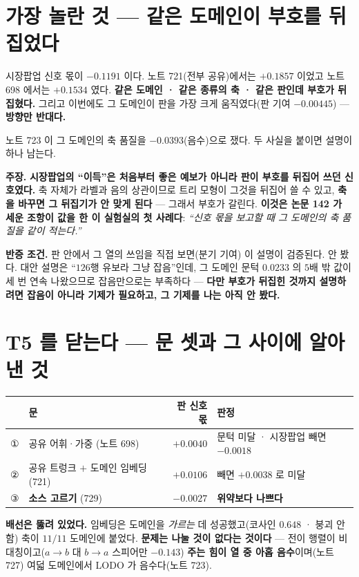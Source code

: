 \documentclass[10pt,a4paper]{article}
\newcommand{\claim}[2]{\begin{claimbox}\textbf{주장.} #1\par\smallskip
  \textcolor{gray!70}{\textbf{반증 조건.} #2}\end{claimbox}}
\begin{document}
\section{가장 놀란 것 --- 같은 도메인이 부호를 뒤집었다}

시장팝업 신호 몫이 \textbf{$-0.1191$} 이다. 노트 721(전부 공유)에서는
\textbf{$+0.1857$} 이었고 노트 698 에서는 $+0.1534$ 였다. \textbf{같은 도메인 ·
같은 종류의 축 · 같은 판인데 부호가 뒤집혔다.} 그리고 이번에도 그 도메인이 판을
가장 크게 움직였다(판 기여 $-0.00445$) --- \textbf{방향만 반대다.}

노트 723 이 그 도메인의 축 품질을 $-0.0393$(음수)으로 쟀다. 두 사실을 붙이면 설명이
하나 남는다.

\claim{\textbf{시장팝업의 ``이득''은 처음부터 좋은 예보가 아니라 판이 부호를 뒤집어
쓰던 신호였다.} 축 자체가 라벨과 음의 상관이므로 트리 모형이 그것을 뒤집어 쓸 수
있고, \textbf{축을 바꾸면 그 뒤집기가 안 맞게 된다} --- 그래서 부호가 갈린다.
\textbf{이것은 논문 142 가 세운 조항이 값을 한 이 실험실의 첫 사례다}: \emph{``신호
몫을 보고할 때 그 도메인의 축 품질을 같이 적는다.''}}
{판 안에서 그 열의 쓰임을 직접 보면(분기 기여) 이 설명이 검증된다. 안 봤다.
대안 설명은 ``$126$행 유보라 그냥 잡음''인데, 그 도메인 문턱 $0.0233$ 의 $5$배 밖
값이 세 번 연속 나왔으므로 잡음만으로는 부족하다 --- \textbf{다만 부호가 뒤집힌
것까지 설명하려면 잡음이 아니라 기제가 필요하고, 그 기제를 나는 아직 안 봤다.}}

\section{T5 를 닫는다 --- 문 셋과 그 사이에 알아낸 것}

\begin{center}
\begin{tabular}{llrl}
\toprule
& 문 & 판 신호 몫 & 판정 \\
\midrule
① & 공유 어휘·가중 (노트 698) & $+0.0040$ & 문턱 미달 · 시장팝업 빼면 $-0.0018$ \\
② & 공유 트렁크 $+$ 도메인 임베딩 (721) & $+0.0106$ & 빼면 $+0.0038$ 로 미달 \\
③ & \textbf{소스 고르기} (729) & $\mathbf{-0.0027}$ & \textbf{위약보다 나쁘다} \\
\bottomrule
\end{tabular}
\end{center}

\textbf{배선은 뚫려 있었다.} 임베딩은 도메인을 \emph{가르는} 데 성공했고(코사인
$0.648$ · 붕괴 안 함) 축이 $11/11$ 도메인에 붙었다. \textbf{문제는 나눌 것이
없다는 것이다} --- 전이 행렬이 비대칭이고($a\to b$ 대 $b\to a$ 스피어만 $-0.143$)
\textbf{주는 힘이 열 중 아홉 음수}이며(노트 727) 여덟 도메인에서 LODO 가
음수다(노트 723).
\end{document}
